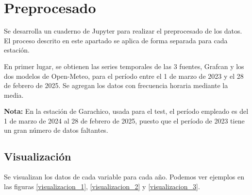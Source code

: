 \section{Preprocesado}

Se desarrolla un cuaderno de Jupyter para realizar el preprocesado de los datos. El proceso descrito en este apartado
se aplica de forma separada para cada estación.

En primer lugar, se obtienen las series temporales de las 3 fuentes, Grafcan y los dos modelos de Open-Meteo, para el período entre el 1 de marzo de 2023 y el 28 de febrero de 2025.
Se agregan los datos con frecuencia horaria mediante la media. 

\textbf{Nota:} En la estación de Garachico, usada para el test, el período empleado es del 1 de marzo de 2024 al 28 de febrero de 2025, puesto que el período de 2023 tiene 
un gran número de datos faltantes.

\subsection{Visualización}
Se visualizan los datos de cada variable para cada año. Podemos ver ejemplos en las figuras \ref{visualizacion_1}, \ref{visualizacion_2} y \ref{visualizacion_3}.

